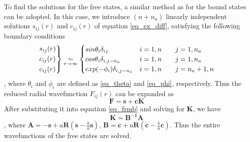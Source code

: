 To find the solutions for the free states, a similar method as for the bound states can be adopted. In this case, we introduce $(n+n_a)$ linearly independent solutions $s_{ij}(r)$ and $c_{ij}(r)$ of equation \ref{eq_ex_diff}, satisfying the following boundary conditions
\begin{equation}
	\begin{rcases}
		s_{ij}(r) \\
		c_{ij}(r) \\
		c_{ij}(r) \\
	\end{rcases}
	\underset{r \to \infty}{\sim} 
	\begin{cases}
	sin\theta_i\delta_{ij} 	& i=1,n \qquad j = 1,n_a\\
	cos\theta_i\delta_{i, j-n_a} & i=1,n \qquad j = 1,n_a\\
	exp(-\phi_i)\delta_{i,j-n_a} & i=1,n \qquad j = n_a+1,n \\
	\end{cases}
\end{equation}
, where $\theta_i$ and $\phi_i$ are defined as \ref{eq_theta} and \ref{eq_phi}, respectively. Thus the reduced radial wavefunction $F_{ij}(r)$ can be expanded as
\begin{equation}
	\mathbf{F=s+cK}
\end{equation}
After substituting it into equation \ref{eq_frmb} and solving for $\mathbf{K}$, we have
\begin{equation}
	\mathbf{K=B^{-1}A}
\end{equation}
, where $\mathbf{A} = -\mathbf{s} +a\mathbf{R}(\dot{\mathbf{s}}-\frac{b}{a}\mathbf{s})$, $\mathbf{B} = \mathbf{c} +a\mathbf{R}(\dot{\mathbf{c}}-\frac{b}{a}\mathbf{c})$. Thus the entire wavefunctions of the free states are solved.


